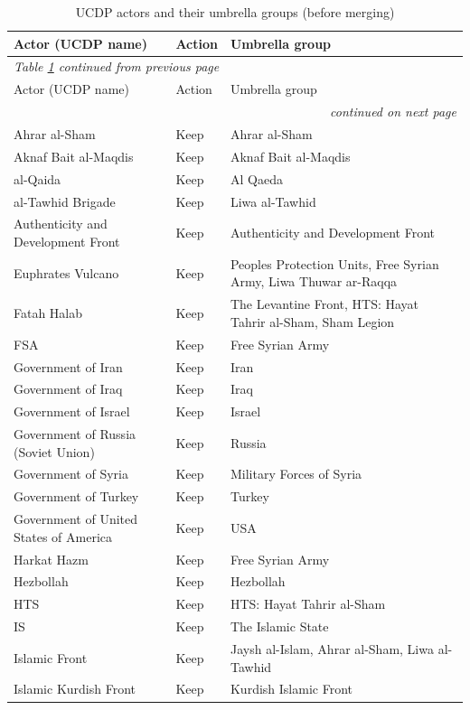 \begin{longtable}{p{6.4cm} l p{6.0cm}}
\caption{UCDP actors and their umbrella groups (before merging)}
\label{tab:umbrella_ucdp} \\
\hline\hline
Actor (UCDP name) & Action & Umbrella group \\
\hline
\endfirsthead
\multicolumn{3}{l}{\footnotesize\emph{Table \ref{tab:umbrella_ucdp} continued from previous page}} \\
\hline\hline
Actor (UCDP name) & Action & Umbrella group \\
\hline
\endhead
\hline
\multicolumn{3}{r}{\footnotesize\emph{continued on next page}} \\
\endfoot
\hline\hline
\endlastfoot
Ahrar al-Sham & Keep & Ahrar al-Sham \\
Aknaf Bait al-Maqdis & Keep & Aknaf Bait al-Maqdis \\
al-Qaida & Keep & Al Qaeda \\
al-Tawhid Brigade & Keep & Liwa al-Tawhid \\
Authenticity and Development Front & Keep & Authenticity and Development Front \\
Euphrates Vulcano & Keep & Peoples Protection Units, Free Syrian Army, Liwa Thuwar ar-Raqqa \\
Fatah Halab & Keep & The Levantine Front, HTS: Hayat Tahrir al-Sham, Sham Legion \\
FSA & Keep & Free Syrian Army \\
Government of Iran & Keep & Iran \\
Government of Iraq & Keep & Iraq \\
Government of Israel & Keep & Israel \\
Government of Russia (Soviet Union) & Keep & Russia \\
Government of Syria & Keep & Military Forces of Syria \\
Government of Turkey & Keep & Turkey \\
Government of United States of America & Keep & USA \\
Harkat Hazm & Keep & Free Syrian Army \\
Hezbollah & Keep & Hezbollah \\
HTS & Keep & HTS: Hayat Tahrir al-Sham \\
IS & Keep & The Islamic State \\
Islamic Front & Keep & Jaysh al-Islam, Ahrar al-Sham, Liwa al-Tawhid \\
Islamic Kurdish Front & Keep & Kurdish Islamic Front \\

\end{longtable}
